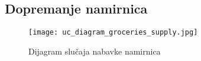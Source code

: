 \subsection{Dopremanje namirnica}
\begin{figure}[H]
\begin{center}
\texttt{[image: uc\_diagram\_groceries\_supply.jpg]}

    \caption{Dijagram slučaja nabavke namirnica}
    \end{center}
\label{fig:Uc_diagram_groceries_supply}
\end{figure}

